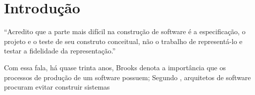 
\section{Introdução}

``Acredito que a parte mais difícil na construção de software é a especificação, o projeto e o teste de seu construto
conceitual, não o trabalho de representá-lo e testar a fidelidade da representação.'' \cite{brooks:95}

Com essa fala, há quase trinta anos, Brooks denota a importância que os processos de produção de um software possuem;
Segundo \cite{richards:20}, arquitetos de software procuram evitar construir sistemas

